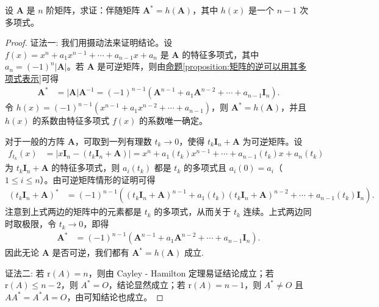 \documentclass[../../main.tex]{subfiles}
\begin{document}
\begin{proposition}\label{proposition:伴随矩阵可原矩阵的多项式表示}
设 \(\boldsymbol{A}\) 是 \(n\) 阶矩阵，求证：伴随矩阵 \(\boldsymbol{A}^* = h(\boldsymbol{A})\)，其中 \(h(x)\) 是一个 \(n - 1\) 次多项式。
\end{proposition}
\begin{proof}
{\color{blue}证法一:}
我们用摄动法来证明结论。设 \(f(x)=x^n + a_1x^{n - 1}+\cdots + a_{n - 1}x + a_n\) 是 \(\boldsymbol{A}\) 的特征多项式，其中 \(a_n = (-1)^n|\boldsymbol{A}|\)。若 \(\boldsymbol{A}\) 是可逆矩阵，则由\hyperref[proposition:矩阵的逆可以用其多项式表示]{命题\ref{proposition:矩阵的逆可以用其多项式表示}}可得
\begin{align*}
\boldsymbol{A}^*&=|\boldsymbol{A}|\boldsymbol{A}^{-1}=(-1)^{n - 1}(\boldsymbol{A}^{n - 1}+a_1\boldsymbol{A}^{n - 2}+\cdots + a_{n - 1}\boldsymbol{I}_n).
\end{align*}
令 \(h(x)=(-1)^{n - 1}(x^{n - 1}+a_1x^{n - 2}+\cdots + a_{n - 1})\)，则 \(\boldsymbol{A}^* = h(\boldsymbol{A})\)，并且 \(h(x)\) 的系数由特征多项式 \(f(x)\) 的系数唯一确定。

对于一般的方阵 \(\boldsymbol{A}\)，可取到一列有理数 \(t_k\rightarrow 0\)，使得 \(t_k\boldsymbol{I}_n+\boldsymbol{A}\) 为可逆矩阵。设
\begin{align*}
f_{t_k}(x)&=|x\boldsymbol{I}_n-(t_k\boldsymbol{I}_n+\boldsymbol{A})|=x^n + a_1(t_k)x^{n - 1}+\cdots + a_{n - 1}(t_k)x + a_n(t_k)
\end{align*}
为 \(t_k\boldsymbol{I}_n+\boldsymbol{A}\) 的特征多项式，则 \(a_i(t_k)\) 都是 \(t_k\) 的多项式且 \(a_i(0)=a_i\)（\(1\leqslant  i\leqslant  n\)）。由可逆矩阵情形的证明可得
\begin{align*}
(t_k\boldsymbol{I}_n+\boldsymbol{A})^*&=(-1)^{n - 1}\left((t_k\boldsymbol{I}_n+\boldsymbol{A})^{n - 1}+a_1(t_k)(t_k\boldsymbol{I}_n+\boldsymbol{A})^{n - 2}+\cdots + a_{n - 1}(t_k)\boldsymbol{I}_n\right).
\end{align*}
注意到上式两边的矩阵中的元素都是 \(t_k\) 的多项式，从而关于 \(t_k\) 连续。上式两边同时取极限，令 \(t_k\rightarrow 0\)，即得
\begin{align*}
\boldsymbol{A}^*&=(-1)^{n - 1}(\boldsymbol{A}^{n - 1}+a_1\boldsymbol{A}^{n - 2}+\cdots + a_{n - 1}\boldsymbol{I}_n).
\end{align*}
因此无论 \(\boldsymbol{A}\) 是否可逆，我们都有 \(\boldsymbol{A}^* = h(\boldsymbol{A})\) 成立.

{\color{blue}证法二:}
若 $\mathrm{r}(A)=n$，则由 Cayley - Hamilton 定理易证结论成立；若 $\mathrm{r}(A)\leqslant  n - 2$，则 $A^* = O$，结论显然成立；若 $\mathrm{r}(A)=n - 1$，则 $A^*\neq O$ 且 $AA^* = A^*A = O$，由可知结论也成立。
\end{proof}
\end{document}
